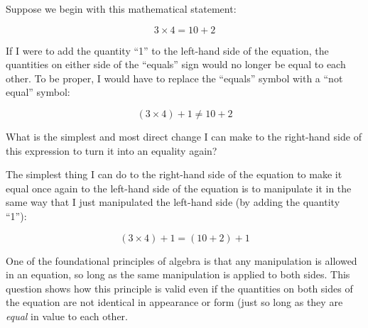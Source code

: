 

Suppose we begin with this mathematical statement:

$$3 \times 4 = 10 + 2$$

If I were to add the quantity ``1'' to the left-hand side of the equation, the quantities on either side of the ``equals'' sign would no longer be equal to each other.  To be proper, I would have to replace the ``equals'' symbol with a ``not equal'' symbol:

$$(3 \times 4) + 1 \not = 10 + 2$$

What is the simplest and most direct change I can make to the right-hand side of this expression to turn it into an equality again?







The simplest thing I can do to the right-hand side of the equation to make it equal once again to the left-hand side of the equation is to manipulate it in the same way that I just manipulated the left-hand side (by adding the quantity ``1''):

$$(3 \times 4) + 1 = (10 + 2) + 1$$







One of the foundational principles of algebra is that any manipulation is allowed in an equation, so long as the same manipulation is applied to both sides.  This question shows how this principle is valid even if the quantities on both sides of the equation are not identical in appearance or form (just so long as they are {\it equal} in value to each other.





